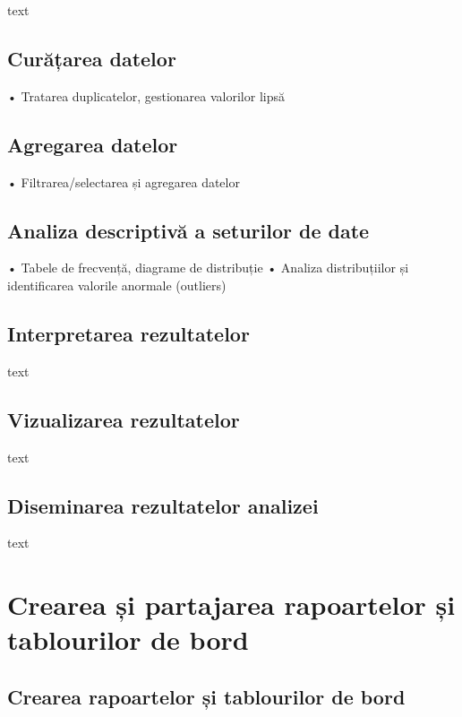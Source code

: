 \documentclass[
  11pt,
  b5paper,
  nottoc]{book}
\begin{document}
text

\section{Curățarea datelor}\label{curux103ux21barea-datelor}

• Tratarea duplicatelor, gestionarea valorilor lipsă

\section{Agregarea datelor}\label{agregarea-datelor}

• Filtrarea/selectarea și agregarea datelor

\section{Analiza descriptivă a seturilor de
date}\label{analiza-descriptivux103-a-seturilor-de-date}

• Tabele de frecvență, diagrame de distribuție • Analiza distribuțiilor
și identificarea valorile anormale (outliers)

\section{Interpretarea rezultatelor}\label{interpretarea-rezultatelor}

text

\section{Vizualizarea rezultatelor}\label{vizualizarea-rezultatelor}

text

\section{Diseminarea rezultatelor
analizei}\label{diseminarea-rezultatelor-analizei}

text


\chapter{Crearea și partajarea rapoartelor și tablourilor de
bord}\label{cap8}

\section{Crearea rapoartelor și tablourilor de
bord}\label{crearea-rapoartelor-ux219i-tablourilor-de-bord}
\end{document}

